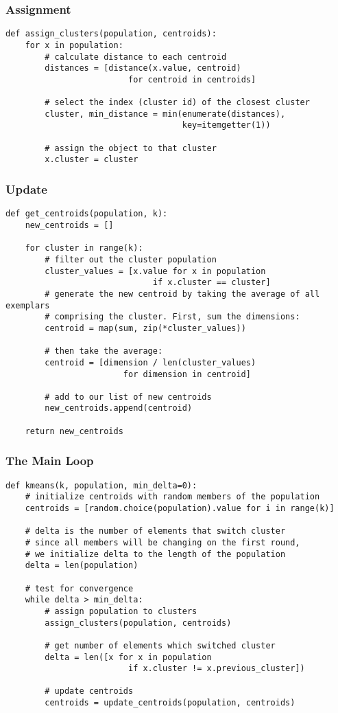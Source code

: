 \documentclass{beamer}
\begin{document}
\begin{frame}[fragile]
\frametitle{Assignment}
\begin{verbatim}
def assign_clusters(population, centroids):
    for x in population:
        # calculate distance to each centroid
        distances = [distance(x.value, centroid) 
                         for centroid in centroids]

        # select the index (cluster id) of the closest cluster
        cluster, min_distance = min(enumerate(distances), 
                                    key=itemgetter(1))

        # assign the object to that cluster
        x.cluster = cluster
\end{verbatim}
\end{frame}

\begin{frame}[fragile]
\frametitle{Update}
\begin{verbatim}
def get_centroids(population, k):
    new_centroids = []

    for cluster in range(k): 
        # filter out the cluster population
        cluster_values = [x.value for x in population 
                              if x.cluster == cluster]
        # generate the new centroid by taking the average of all exemplars
        # comprising the cluster. First, sum the dimensions:
        centroid = map(sum, zip(*cluster_values))

        # then take the average:
        centroid = [dimension / len(cluster_values) 
                        for dimension in centroid]  

        # add to our list of new centroids
        new_centroids.append(centroid)
   
    return new_centroids
\end{verbatim}
\end{frame}

\begin{frame}[fragile]
\frametitle{The Main Loop}
\begin{verbatim}
def kmeans(k, population, min_delta=0):
    # initialize centroids with random members of the population
    centroids = [random.choice(population).value for i in range(k)]
   
    # delta is the number of elements that switch cluster
    # since all members will be changing on the first round,
    # we initialize delta to the length of the population
    delta = len(population)

    # test for convergence
    while delta > min_delta:
        # assign population to clusters
        assign_clusters(population, centroids)
        
        # get number of elements which switched cluster
        delta = len([x for x in population 
                         if x.cluster != x.previous_cluster])

        # update centroids
        centroids = update_centroids(population, centroids)
\end{verbatim}
\end{frame}
\end{document}
